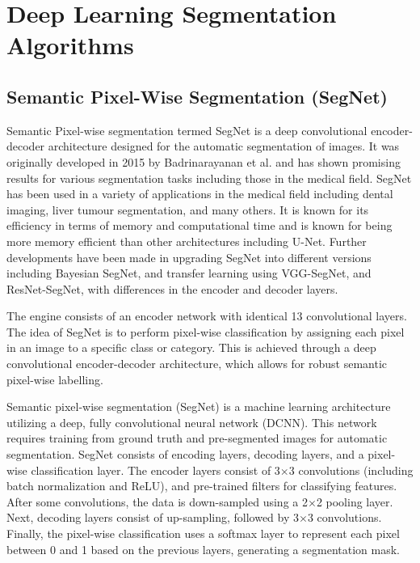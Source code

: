 
\section{Deep Learning Segmentation Algorithms}

\subsection{Semantic Pixel-Wise Segmentation (SegNet)}
Semantic Pixel-wise segmentation termed SegNet is a deep convolutional encoder-decoder architecture designed for the automatic segmentation of images. It was originally developed in 2015 by Badrinarayanan et al.\cite{Badrinarayanan2017} and has shown promising results for various segmentation tasks including those in the medical field. SegNet has been used in a variety of applications in the medical field including dental imaging\cite{kwak2020}, liver tumour segmentation\cite{Priyadarsini2022}, and many others. It is known for its efficiency in terms of memory and computational time and is known for being more memory efficient than other architectures including U-Net\cite{Mirzazade2021}. Further developments have been made in upgrading SegNet into different versions including Bayesian SegNet\cite{Dhanagopal2022}, and transfer learning using VGG-SegNet\cite{daniel2022}, and ResNet-SegNet\cite{mohd2020}, with differences in the encoder and decoder layers.

The engine consists of an encoder network with identical 13 convolutional layers. The idea of SegNet is to perform pixel-wise classification by assigning each pixel in an image to a specific class or category. This is achieved through a deep convolutional encoder-decoder architecture, which allows for robust semantic pixel-wise labelling.

Semantic pixel-wise segmentation (SegNet) is a machine learning architecture utilizing a deep, fully convolutional neural network (DCNN). This network requires training from ground truth and pre-segmented images for automatic segmentation. SegNet consists of encoding layers, decoding layers, and a pixel-wise classification layer. The encoder layers consist of 3$\times$3 convolutions (including batch normalization and ReLU), and pre-trained filters for classifying features. After some convolutions, the data is down-sampled using a 2$\times$2 pooling layer. Next, decoding layers consist of up-sampling, followed by 3$\times$3 convolutions. Finally, the pixel-wise classification uses a softmax layer to represent each pixel between 0 and 1 based on the previous layers, generating a segmentation mask.

